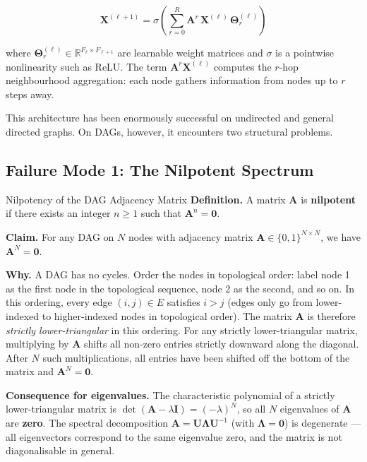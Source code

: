 \begin{equation}
    \mathbf{X}^{(\ell+1)} = \sigma\!\left(
        \sum_{r=0}^{R} \mathbf{A}^r \, \mathbf{X}^{(\ell)} \, \boldsymbol{\Theta}_r^{(\ell)}
    \right)
    \label{eq:fb_gcnn}
\end{equation}

where $\boldsymbol{\Theta}_r^{(\ell)} \in \mathbb{R}^{F_\ell \times F_{\ell+1}}$
are learnable weight matrices and $\sigma$ is a pointwise nonlinearity such as
ReLU. The term $\mathbf{A}^r \mathbf{X}^{(\ell)}$ computes the $r$-hop
neighbourhood aggregation: each node gathers information from nodes up to $r$
steps away.

This architecture has been enormously successful on undirected and general
directed graphs. On DAGs, however, it encounters two structural problems.

\subsection{Failure Mode 1: The Nilpotent Spectrum}

\begin{conceptbox}{Nilpotency of the DAG Adjacency Matrix}
\textbf{Definition.} A matrix $\mathbf{A}$ is \textbf{nilpotent} if there
exists an integer $n \ge 1$ such that $\mathbf{A}^n = \mathbf{0}$.

\medskip
\textbf{Claim.} For any DAG on $N$ nodes with adjacency matrix
$\mathbf{A} \in \{0,1\}^{N \times N}$, we have $\mathbf{A}^N = \mathbf{0}$.

\medskip
\textbf{Why.} A DAG has no cycles. Order the nodes in topological order:
label node 1 as the first node in the topological sequence, node 2 as the
second, and so on. In this ordering, every edge $(i, j) \in E$ satisfies
$i > j$ (edges only go from lower-indexed to higher-indexed nodes in
topological order). The matrix $\mathbf{A}$ is therefore \emph{strictly
lower-triangular} in this ordering. For any strictly lower-triangular matrix,
multiplying by $\mathbf{A}$ shifts all non-zero entries strictly downward
along the diagonal. After $N$ such multiplications, all entries have been
shifted off the bottom of the matrix and $\mathbf{A}^N = \mathbf{0}$.

\medskip
\textbf{Consequence for eigenvalues.}
The characteristic polynomial of a strictly lower-triangular matrix is
$\det(\mathbf{A} - \lambda \mathbf{I}) = (-\lambda)^N$, so all $N$
eigenvalues of $\mathbf{A}$ are \textbf{zero}. The spectral decomposition
$\mathbf{A} = \mathbf{U} \boldsymbol{\Lambda} \mathbf{U}^{-1}$ (with
$\boldsymbol{\Lambda} = \mathbf{0}$) is degenerate --- all eigenvectors
correspond to the same eigenvalue zero, and the matrix is not diagonalisable
in general.
\end{conceptbox}

